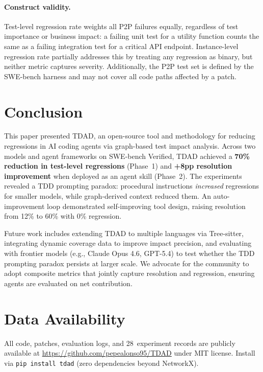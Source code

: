 \documentclass[sigconf,nonacm]{acmart}
\begin{document}
\paragraph{Construct validity.}
Test-level regression rate weights all P2P failures equally, regardless
of test importance or business impact: a failing unit test for a
utility function counts the same as a failing integration test for a
critical API endpoint.  Instance-level regression rate partially
addresses this by treating any regression as binary, but neither metric
captures severity.  Additionally, the P2P test set is defined by the
SWE-bench harness and may not cover all code paths affected by a patch.


\section{Conclusion}
\label{sec:conclusion}

This paper presented \textsc{TDAD}, an open-source tool and methodology for reducing
regressions in AI coding agents via graph-based test impact analysis.  Across
two models and agent frameworks on SWE-bench Verified, \textsc{TDAD} achieved
a \textbf{70\% reduction in test-level regressions} (Phase~1) and
\textbf{+8pp resolution improvement} when deployed as an agent skill
(Phase~2).  The experiments revealed a TDD prompting paradox: procedural instructions
\emph{increased} regressions for smaller models, while graph-derived context
reduced them.  An auto-improvement loop demonstrated self-improving tool
design, raising resolution from 12\% to 60\% with 0\% regression.

Future work includes extending \textsc{TDAD} to multiple languages via
Tree-sitter, integrating dynamic coverage data to improve impact precision,
and evaluating with frontier models (e.g., Claude Opus 4.6, GPT-5.4) to test
whether the TDD prompting paradox persists at larger scale.  We advocate for
the community to adopt composite metrics that jointly capture resolution and
regression, ensuring agents are evaluated on net contribution.


\section{Data Availability}
\label{sec:data}

All code, patches, evaluation logs, and 28~experiment records are publicly
available at \url{https://github.com/pepealonso95/TDAD} under MIT license.
Install via \texttt{pip install tdad} (zero dependencies beyond NetworkX).
\end{document}

